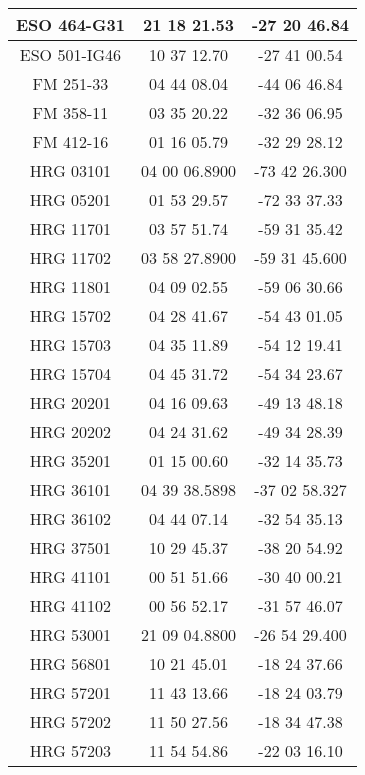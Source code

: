 \begin{apendicesenv}
\begin{longtable}{|c|c|c|}
            ESO 464-G31 & 21 18 21.53 & -27 20 46.84 \\ \hline
            ESO 501-IG46 & 10 37 12.70 & -27 41 00.54 \\ \hline
            FM 251-33 & 04 44 08.04 & -44 06 46.84 \\ \hline
            FM 358-11 & 03 35 20.22 & -32 36 06.95 \\ \hline
            FM 412-16 & 01 16 05.79 & -32 29 28.12 \\ \hline
            HRG 03101 & 04 00 06.8900 & -73 42 26.300 \\ \hline
            HRG 05201 & 01 53 29.57 & -72 33 37.33 \\ \hline
            HRG 11701 & 03 57 51.74 & -59 31 35.42 \\ \hline
            HRG 11702 & 03 58 27.8900 & -59 31 45.600 \\ \hline
            HRG 11801 & 04 09 02.55 & -59 06 30.66 \\ \hline
            HRG 15702 & 04 28 41.67 & -54 43 01.05 \\ \hline
            HRG 15703 & 04 35 11.89 & -54 12 19.41 \\ \hline
            HRG 15704 & 04 45 31.72 & -54 34 23.67 \\ \hline
            HRG 20201 & 04 16 09.63 & -49 13 48.18 \\ \hline
            HRG 20202 & 04 24 31.62 & -49 34 28.39 \\ \hline
            HRG 35201 & 01 15 00.60 & -32 14 35.73 \\ \hline
            HRG 36101 & 04 39 38.5898 & -37 02 58.327 \\ \hline
            HRG 36102 & 04 44 07.14 & -32 54 35.13 \\ \hline
            HRG 37501 & 10 29 45.37 & -38 20 54.92 \\ \hline
            HRG 41101 & 00 51 51.66 & -30 40 00.21 \\ \hline
            HRG 41102 & 00 56 52.17 & -31 57 46.07 \\ \hline
            HRG 53001 & 21 09 04.8800 & -26 54 29.400 \\ \hline
            HRG 56801 & 10 21 45.01 & -18 24 37.66 \\ \hline
            HRG 57201 & 11 43 13.66 & -18 24 03.79 \\ \hline
            HRG 57202 & 11 50 27.56 & -18 34 47.38 \\ \hline
            HRG 57203 & 11 54 54.86 & -22 03 16.10 \\ \hline

\end{longtable}
\end{apendicesenv}
